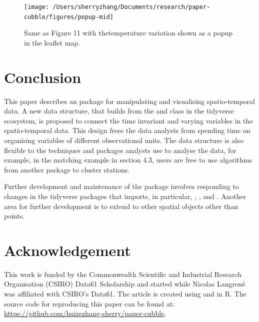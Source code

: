 \documentclass[
]{jss}
\begin{document}
\begin{CodeChunk}
\begin{figure}

{\centering \texttt{[image: /Users/sherryzhang/Documents/research/paper-cubble/figures/popup-mid]} 

}

\caption[Same as Figure 11 with thetemperature variation shown as a popup in the leaflet map]{Same as Figure 11 with thetemperature variation shown as a popup in the leaflet map.}\label{fig:interactive-popup}
\end{figure}
\end{CodeChunk}

\hypertarget{conclusion}{%
\section{Conclusion}\label{conclusion}}

This paper describes an  package  for
manipulating and visualising spatio-temporal data. A new data structure,
 that builds from the  and
 class in the tidyverse ecosystem, is proposed to
connect the time invariant and varying variables in the spatio-temporal
data. This design frees the data analysts from spending time on
organising variables of different observational units. The data
structure is also flexible to the techniques and packages analysts use
to analyse the data, for example, in the matching example in section
4.3, users are free to use algorithms from another package to cluster
stations.

Further development and maintenance of the package involves responding
to changes in the tidyverse packages that  imports, in
particular, , , and . Another area for
further development is to extend  to other spatial objects
other than points.

\newpage

\hypertarget{acknowledgement}{%
\section{Acknowledgement}\label{acknowledgement}}

This work is funded by the Commonwealth Scientific and Industrial
Research Organisation (CSIRO) Data61 Scholarship and started while
Nicolas Langrené was affiliated with CSIRO's Data61. The article is
created using  \citep{knitr} and 
\citep{rmarkdown} in R. The source code for reproducing this paper can
be found at: \url{https://github.com/huizezhang-sherry/paper-cubble}.
\end{document}
